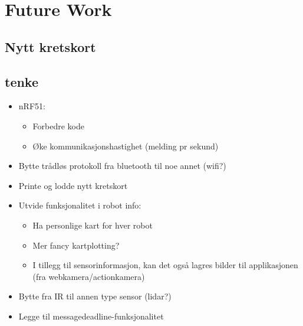 \chapter{Future Work}
    \section{Nytt kretskort}
    \label{sec:fwSkjold}

    \section{tenke}
\begin{itemize}
    \item nRF51:
    \begin{itemize}
        \item Forbedre kode
        \item Øke kommunikasjonshastighet (melding pr sekund)
    \end{itemize}
    \item Bytte trådløs protokoll fra bluetooth til noe annet (wifi?)
    \item Printe og lodde nytt kretskort
    \item Utvide funksjonalitet i robot info:
    \begin{itemize}
        \item Ha personlige kart for hver robot
        \item Mer fancy kartplotting?
        \item I tillegg til sensorinformasjon, kan det også lagres bilder til applikasjonen (fra webkamera/actionkamera)
    \end{itemize}
    \item Bytte fra IR til annen type sensor (lidar?)
    \item Legge til messagedeadline-funksjonalitet
\end{itemize}